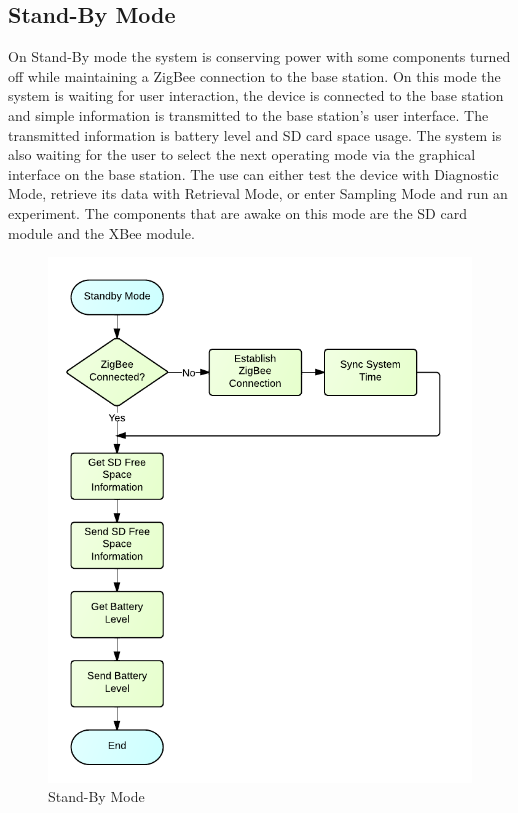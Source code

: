\subsection{Stand-By Mode}
On Stand-By mode the system is conserving power with some components turned off while maintaining a ZigBee connection to the base station. On this mode the system is waiting for user interaction, the device is connected to the base station and simple information is transmitted to the base station's user interface. The transmitted information is battery level and SD card space usage. The system is also waiting for the user to select the next operating mode via the graphical interface on the base station. The use can either test the device with Diagnostic Mode, retrieve its data with Retrieval Mode, or enter Sampling Mode and run an experiment. The components that are awake on this mode are the SD card module and the XBee module.
\begin{figure}[H]
	\centering
	\includegraphics[scale=1.0]{img/StandByMode}
	\caption{Stand-By Mode \label{fig:standByMode}}
\end{figure}

